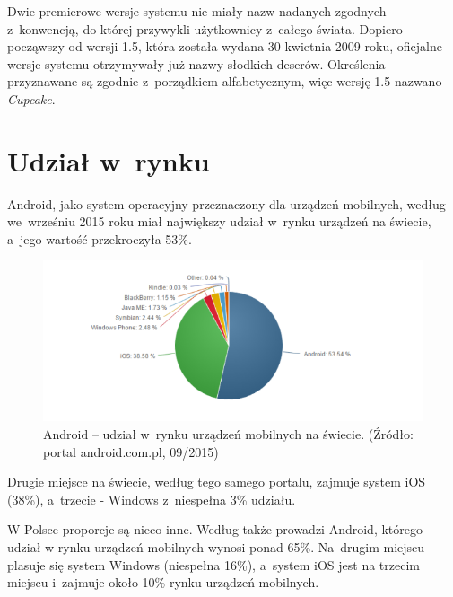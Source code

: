 Dwie premierowe wersje systemu nie miały nazw nadanych zgodnych z~konwencją, do której przywykli użytkownicy z~całego świata. Dopiero począwszy od wersji 1.5, która została wydana 30 kwietnia 2009 roku, oficjalne wersje systemu otrzymywały już nazwy słodkich deserów. Określenia przyznawane są zgodnie z~porządkiem alfabetycznym, więc wersję 1.5 nazwano \textit{Cupcake}.

\section{Udział w~rynku}
Android, jako system operacyjny przeznaczony dla urządzeń mobilnych, według \cite{website:android:stat2} we~wrześniu 2015 roku miał największy udział w~rynku urządzeń na świecie, a~jego wartość przekroczyła 53\%.

\begin{figure}[!htb]
    \centering
    \includegraphics[width=17cm]{imgs/ch2_android_udzial_2.png}
    \caption
{Android – udział w~rynku urządzeń mobilnych na świecie. (Źródło: portal android.com.pl, 09/2015)}
    \label{fig:android_udzial_zagranica}
\end{figure} 

Drugie miejsce na świecie, według tego samego portalu, zajmuje system iOS (38\%), a~trzecie - Windows z~niespełna 3\% udziału. 

W Polsce proporcje są nieco inne. Według \cite{website:android:stat1} także prowadzi Android, którego udział w rynku urządzeń mobilnych wynosi ponad 65\%. Na~drugim miejscu plasuje się system Windows (niespełna 16\%), a~system iOS jest na trzecim miejscu i~zajmuje około 10\% rynku urządzeń mobilnych.

